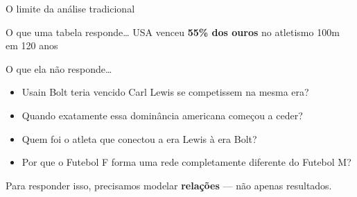 \begin{frame}{O limite da análise tradicional}
    \begin{block}{O que uma tabela responde\ldots}
        \footnotesize\centering
        USA venceu \textbf{55\% dos ouros} no atletismo 100m em 120 anos \cite{Olympics100mWinners2024}
    \end{block}

    \vspace{0.3cm}

    \begin{alertblock}{O que ela não responde\ldots}
        \footnotesize
        \begin{itemize}
            \item Usain Bolt teria vencido Carl Lewis se competissem na mesma era?
            \item Quando exatamente essa dominância americana começou a ceder?
            \item Quem foi o atleta que conectou a era Lewis à era Bolt?
            \item Por que o Futebol F forma uma rede completamente diferente do Futebol M?
        \end{itemize}
    \end{alertblock}

    \vspace{0.3cm}

    \begin{center}
        \footnotesize
        Para responder isso, precisamos modelar \textbf{relações} --- não apenas resultados.
    \end{center}
\end{frame}

